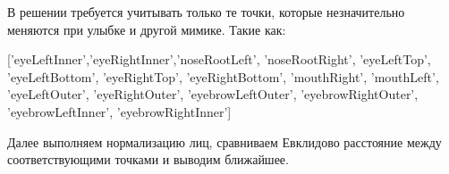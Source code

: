 \solutionSection

В решении требуется учитывать только те точки, которые незначительно меняются при улыбке и другой мимике. Такие как: 

['eyeLeftInner','eyeRightInner','noseRootLeft', 'noseRootRight', 'eyeLeftTop', \linebreak 'eyeLeftBottom', 'eyeRightTop', 'eyeRightBottom', 'mouthRight', 'mouthLeft', \\'eyeLeftOuter', 'eyeRightOuter', 'eyebrowLeftOuter', 'eyebrowRightOuter', \\ 'eyebrowLeftInner', 'eyebrowRightInner']

Далее выполняем нормализацию лиц, сравниваем Евклидово расстояние между соответствующими точками и выводим ближайшее.

\codeExample

